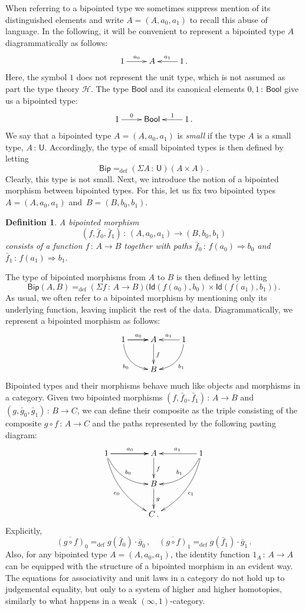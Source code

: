 \documentclass[10pt,a4paper,oneside,reqno]{amsart}
\theoremstyle{mythm}
\theoremstyle{mydef}
\newtheorem{definition}[theorem]{Definition}
\theoremstyle{myrmk}
\newcommand{\ie}{\text{i.e.\ }}
\newcommand{\defeq}{=_{\mathrm{def}}}
\newcommand{\co}{\,{:}\,}
\newcommand{\Hint}{\mathcal{H}}
\newcommand{\Bool}{\mathsf{Bool}}
\newcommand{\Id}{\mathsf{Id}}
\newcommand{\U}{\mathsf{U}}
\newcommand{\Bip}{\mathsf{Bip}}
\newcommand{\BipHom}{\mathsf{Bip}}
\begin{document}
When referring to a bipointed type we sometimes suppress mention of its distinguished elements and write $A = (A, a_0, a_1)$ to recall this abuse of language.  In the following, it will be convenient to represent a bipointed type $A$  
diagrammatically as follows:
\[
\xymatrix{
1 \ar[r]^-{a_0}&  A & 1 \ar[l]_-{a_1} \, .}
 \]
Here, the symbol $1$ does not represent the unit type, which is not assumed as part the type theory $\Hint$.
The type $\Bool$ and its canonical elements $0, 1 \co \Bool$ give us a bipointed type:
\[
\xymatrix{
 1 \ar[r]^-{0}&  \Bool  & 1 \ar[l]_-{1} \, . }
 \]
We say that a bipointed type $A = (A, a_0, a_1)$ is \emph{small} if the type $A$ is a small type, \ie $A \co \U$. 
Accordingly, the type of small bipointed types is then defined by letting 
\[
\Bip \defeq (\Sigma A \co \U)( A \times A ) \, .
\]
Clearly,  this type is not small.  Next, we introduce the notion of a bipointed morphism between bipointed types. 
For this, let us fix two bipointed types $A = (A, a_0, a_1)$ and~$B = (B, b_0, b_1)$. 


\begin{definition} A \emph{bipointed morphism} 
\[
(f, \bar{f}_0, \bar{f}_1)  \co (A, a_0, a_1)  \to (B, b_0, b_1)
\] 
consists of a function $f \co A \to B$ together with paths $\bar{f}_0 \co  f(a_0) \Rightarrow b_0$ 
and~$\bar{f}_1 \co f(a_1) \Rightarrow b_1$.  \end{definition}


The type of bipointed morphisms from $A$ to $B$ is then defined by letting
\[
\BipHom(A,B) \defeq (\Sigma f \co A \to B) \big( \Id(  f(a_0), b_0 )  \times \Id(  f(a_1), b_1 )  \big) \, .
\]
As usual, we often refer to a bipointed morphism by mentioning only its underlying function, leaving implicit
the rest of the data. Diagrammatically, we represent a bipointed morphism as follows:
\[
\xymatrix{
1 \ar[r]   \ar[r]^{a_0} \ar@/_1pc/[dr]_{b_0}  & A  \ar[d]^{f} & 1  \ar[l]_{a_1} \ar@/^1pc/[dl]^{b_1} \\
  & B  &  }
 \]
Bipointed types and their morphisms behave much like objects and morphisms in a category.
Given two bipointed morphisms  $(f, \bar{f}_0, \bar{f}_1) \co A \to B$ and $(g, \bar{g}_0, \bar{g}_1) \co B \to C$, we can define their composite 
 as the triple consisting of the composite $g \circ f \co A \to C$ and the paths represented
by the following pasting diagram:
\[
\xymatrix@C=1.5cm{
1 \ar[r]   \ar[r]^{a_0}   \ar@/_1pc/[dr]^{b_0} \ar@/_1pc/[ddr]_{c_0}  & A  \ar[d]^{f} & 1 \ar[l]_{a_1}  \ar@/^1pc/[dl]_{b_1}  \ar@/^1pc/[ddl]^{c_1} \\
  & B \ar[d]^g &   \\
  & C \, . &   }
  \]
Explicitly,
\[
\overline{(g \circ f)}_0 \defeq g(\bar{f}_0) \cdot  \bar{g}_0 \, ,   \quad 
\overline{(g \circ f) }_1 \defeq  g(\bar{f}_1) \cdot   \bar{g}_1 \, .
\]
Also, for any bipointed type $A = (A, a_0, a_1)$, the identity function $1_A \co A \to A$ can be equipped with the structure of a bipointed morphism in an evident way. 
The equations for associativity and unit laws in a category do not hold up to judgemental equality, but only 
to a system of higher and higher homotopies, similarly to what happens in a weak $(\infty,1)$-category.  
\end{document}
